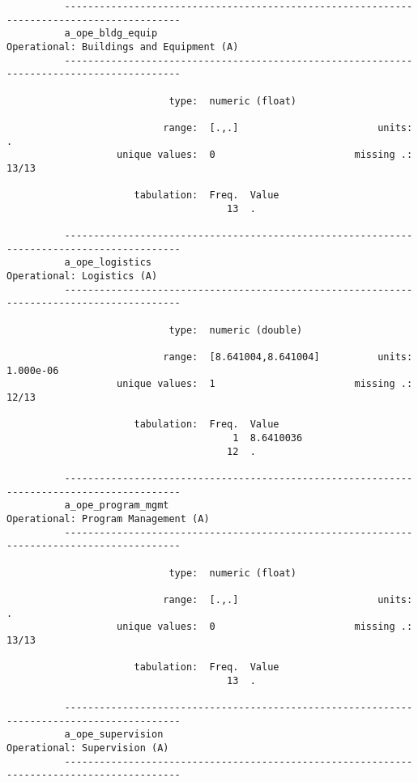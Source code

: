 \documentclass{article}
\begin{document}
\begin{verbatim}
          ------------------------------------------------------------------------------------------
          a_ope_bldg_equip                                  Operational: Buildings and Equipment (A)
          ------------------------------------------------------------------------------------------
          
                            type:  numeric (float)
          
                           range:  [.,.]                        units:  .
                   unique values:  0                        missing .:  13/13
          
                      tabulation:  Freq.  Value
                                      13  .
          
          ------------------------------------------------------------------------------------------
          a_ope_logistics                                                 Operational: Logistics (A)
          ------------------------------------------------------------------------------------------
          
                            type:  numeric (double)
          
                           range:  [8.641004,8.641004]          units:  1.000e-06
                   unique values:  1                        missing .:  12/13
          
                      tabulation:  Freq.  Value
                                       1  8.6410036
                                      12  .
          
          ------------------------------------------------------------------------------------------
          a_ope_program_mgmt                                     Operational: Program Management (A)
          ------------------------------------------------------------------------------------------
          
                            type:  numeric (float)
          
                           range:  [.,.]                        units:  .
                   unique values:  0                        missing .:  13/13
          
                      tabulation:  Freq.  Value
                                      13  .
          
          ------------------------------------------------------------------------------------------
          a_ope_supervision                                             Operational: Supervision (A)
          ------------------------------------------------------------------------------------------
          

\end{verbatim}
\end{document}
